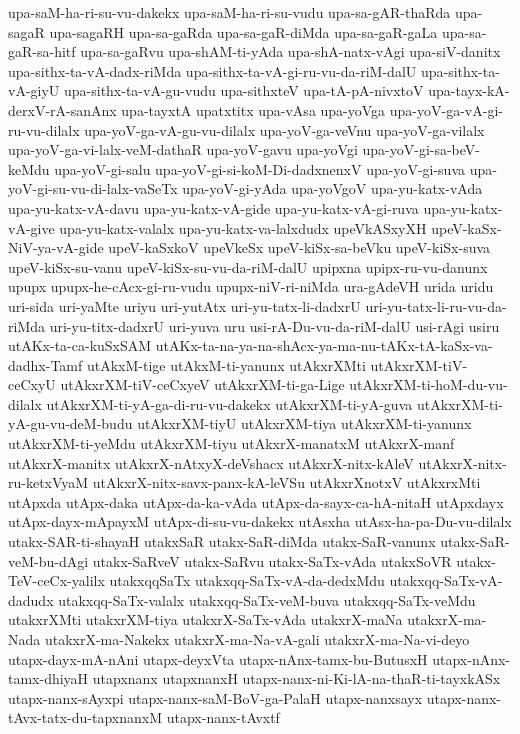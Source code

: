 {upa-saM-ha-ri-su-vu-dakekx
upa-saM-ha-ri-su-vudu
upa-sa-gAR-thaRda
upa-sagaR
upa-sagaRH
upa-sa-gaRda
upa-sa-gaR-diMda
upa-sa-gaR-gaLa
upa-sa-gaR-sa-hitf
upa-sa-gaRvu
upa-shAM-ti-yAda
upa-shA-natx-vAgi
upa-siV-danitx
upa-sithx-ta-vA-dadx-riMda
upa-sithx-ta-vA-gi-ru-vu-da-riM-dalU
upa-sithx-ta-vA-giyU
upa-sithx-ta-vA-gu-vudu
upa-sithxteV
upa-tA-pA-nivxtoV
upa-tayx-kA-derxV-rA-sanAnx
upa-tayxtA
upatxtitx
upa-vAsa
upa-yoVga
upa-yoV-ga-vA-gi-ru-vu-dilalx
upa-yoV-ga-vA-gu-vu-dilalx
upa-yoV-ga-veVnu
upa-yoV-ga-vilalx
upa-yoV-ga-vi-lalx-veM-dathaR
upa-yoV-gavu
upa-yoVgi
upa-yoV-gi-sa-beV-keMdu
upa-yoV-gi-salu
upa-yoV-gi-si-koM-Di-dadxnenxV
upa-yoV-gi-suva
upa-yoV-gi-su-vu-di-lalx-vaSeTx
upa-yoV-gi-yAda
upa-yoVgoV
upa-yu-katx-vAda
upa-yu-katx-vA-davu
upa-yu-katx-vA-gide
upa-yu-katx-vA-gi-ruva
upa-yu-katx-vA-give
upa-yu-katx-valalx
upa-yu-katx-va-lalxdudx
upeVkASxyXH
upeV-kaSx-NiV-ya-vA-gide
upeV-kaSxkoV
upeVkeSx
upeV-kiSx-sa-beVku
upeV-kiSx-suva
upeV-kiSx-su-vanu
upeV-kiSx-su-vu-da-riM-dalU
upipxna
upipx-ru-vu-danunx
upupx
upupx-he-cAcx-gi-ru-vudu
upupx-niV-ri-niMda
ura-gAdeVH
urida
uridu
uri-sida
uri-yaMte
uriyu
uri-yutAtx
uri-yu-tatx-li-dadxrU
uri-yu-tatx-li-ru-vu-da-riMda
uri-yu-titx-dadxrU
uri-yuva
uru
usi-rA-Du-vu-da-riM-dalU
usi-rAgi
usiru
utAKx-ta-ca-kuSxSAM
utAKx-ta-na-ya-na-shAcx-ya-ma-nu-tAKx-tA-kaSx-va-dadhx-Tamf
utAkxM-tige
utAkxM-ti-yanunx
utAkxrXMti
utAkxrXM-tiV-ceCxyU
utAkxrXM-tiV-ceCxyeV
utAkxrXM-ti-ga-Lige
utAkxrXM-ti-hoM-du-vu-dilalx
utAkxrXM-ti-yA-ga-di-ru-vu-dakekx
utAkxrXM-ti-yA-guva
utAkxrXM-ti-yA-gu-vu-deM-budu
utAkxrXM-tiyU
utAkxrXM-tiya
utAkxrXM-ti-yanunx
utAkxrXM-ti-yeMdu
utAkxrXM-tiyu
utAkxrX-manatxM
utAkxrX-manf
utAkxrX-manitx
utAkxrX-nAtxyX-deVshacx
utAkxrX-nitx-kAleV
utAkxrX-nitx-ru-ketxVyaM
utAkxrX-nitx-savx-panx-kA-leVSu
utAkxrXnotxV
utAkxrxMti
utApxda
utApx-daka
utApx-da-ka-vAda
utApx-da-sayx-ca-hA-nitaH
utApxdayx
utApx-dayx-mApayxM
utApx-di-su-vu-dakekx
utAsxha
utAsx-ha-pa-Du-vu-dilalx
utakx-SAR-ti-shayaH
utakxSaR
utakx-SaR-diMda
utakx-SaR-vanunx
utakx-SaR-veM-bu-dAgi
utakx-SaRveV
utakx-SaRvu
utakx-SaTx-vAda
utakxSoVR
utakx-TeV-ceCx-yalilx
utakxqqSaTx
utakxqq-SaTx-vA-da-dedxMdu
utakxqq-SaTx-vA-dadudx
utakxqq-SaTx-valalx
utakxqq-SaTx-veM-buva
utakxqq-SaTx-veMdu
utakxrXMti
utakxrXM-tiya
utakxrX-SaTx-vAda
utakxrX-maNa
utakxrX-ma-Nada
utakxrX-ma-Nakekx
utakxrX-ma-Na-vA-gali
utakxrX-ma-Na-vi-deyo
utapx-dayx-mA-nAni
utapx-deyxVta
utapx-nAnx-tamx-bu-ButusxH
utapx-nAnx-tamx-dhiyaH
utapxnanx
utapxnanxH
utapx-nanx-ni-Ki-lA-na-thaR-ti-tayxkASx
utapx-nanx-sAyxpi
utapx-nanx-saM-BoV-ga-PalaH
utapx-nanxsayx
utapx-nanx-tAvx-tatx-du-tapxnanxM
utapx-nanx-tAvxtf
}

